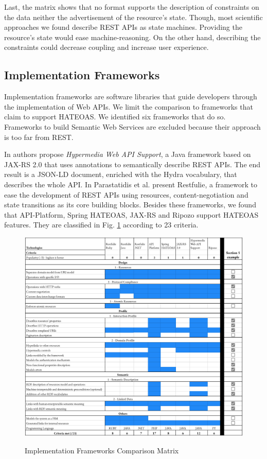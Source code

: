 Last, the matrix shows that no format supports the description of constraints on the data neither the advertisement of the resource's state. Though, most scientific approaches we found describe REST APIs as state machines. Providing the resource's state would ease machine-reasoning. On the other hand, describing the constraints could decrease coupling and increase user experience. %

\subsection{Implementation Frameworks}

Implementation frameworks are software libraries that guide developers through the implementation of Web APIs. We limit the comparison to frameworks that claim to support HATEOAS. We identified six frameworks that do so. Frameworks to build Semantic Web Services are excluded because their approach is too far from REST.

In \cite{salvadori2014framework} authors propose \textit{Hypermedia Web API Support}, a Java framework based on JAX-RS 2.0 that uses annotations to semantically describe REST APIs. The end result is a JSON-LD document, enriched with the Hydra vocabulary, that describes the whole API. In \cite{parastatidis2010role} Parastatidis et al. present Restfulie, a framework to ease the development of REST APIs using resources, content-negotiation and state transitions as its core building blocks. Besides these frameworks, we found that API-Platform, Spring HATEOAS, JAX-RS and Ripozo support HATEOAS features. They are classified in Fig. \ref{frameworks-matrix} according to 23 criteria.

\begin{figure}[!ht]
\caption{Implementation Frameworks Comparison Matrix}
\includegraphics[width=1\textwidth]{figures/frameworks.png}
\label{frameworks-matrix}
\end{figure}

